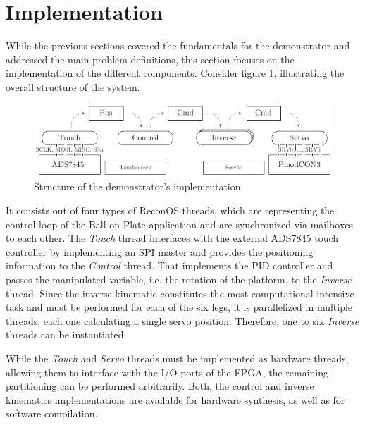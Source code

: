 \section{Implementation}
While the previous sections covered the fundamentals for the demonstrator and
addressed the main problem definitions, this section focuses on the
implementation of the different components. Consider figure
\ref{fig:demo_structure}, illustrating the overall structure of the system.
\begin{figure}
	\centering
	\includegraphics{../figures/demo_structure}
	\caption{Structure of the demonstrator's implementation}
	\label{fig:demo_structure}
\end{figure}
It consists out of four types of ReconOS threads, which are representing the
control loop of the Ball on Plate application and are synchronized via
mailboxes to each other. The \emph{Touch} thread interfaces with the external
ADS7845 touch controller by implementing an \ac{SPI} master and provides the
positioning information to the \emph{Control} thread. That implements the
\ac{PID} controller and passes the manipulated variable, i.e. the rotation of
the platform, to the \emph{Inverse} thread. Since the inverse kinematic
constitutes the most computational intensive task and must be performed for
each of the six legs, it is parallelized in multiple threads, each one
calculating a single servo position. Therefore, one to six \emph{Inverse}
threads can be instantiated.

While the \emph{Touch} and \emph{Servo} threads must be implemented as
hardware threads, allowing them to interface with the I/O ports of the FPGA,
the remaining partitioning can be performed arbitrarily. Both, the control and
inverse kinematics implementations are available for hardware synthesis, as
well as for software compilation.


